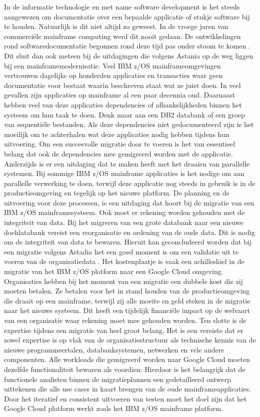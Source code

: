 In de informatie technologie en met name software development is het steeds aangewezen om documentatie over een bepaalde applicatie of stukje software bij te houden. Natuurlijk is dit niet altijd zo geweest. In de vroege jaren van commerciële mainframe computing werd dit nooit gedaan. De ontwikkelingen rond softwaredocumentatie begonnen rond deze tijd pas onder stoom te komen \autocite{Zachry2001}. Dit sluit dan ook meteen  bij de uitdagingen die volgens Astania op de weg liggen bij een mainframemodernisatie. Veel IBM z/OS mainframeomgevingen vertrouwen dagelijks op honderden applicaties en transacties waar geen documentatie voor bestaat waarin beschreven staat wat ze juist doen. In veel gevallen zijn applicaties op mainframe al een paar decennia oud. Daarnaast hebben veel van deze applicaties dependencies of afhankelijkheden binnen het systeem om hun taak te doen. Denk maar aan een DB2 databank of een groep van sequentiële bestanden. Als deze dependencies niet gedocumenteerd zijn is het moeilijk om te achterhalen wat deze applicaties nodig hebben tijdens hun uitvoering. Om een succesvolle migratie door te voeren is het van essentieel belang dat ook de dependencies mee gemigreerd worden met de applicatie. Anderzijds is er een uitdaging dat te maken heeft met het draaien van parallelle systemen. Bij sommige IBM z/OS mainframe applicaties is het nodige om aan parallelle verwerking te doen, terwijl deze applicatie nog steeds in gebruik is in de productieomgeving en tegelijk op het nieuwe platform. De planning en de uitvoering voor deze processen, is een uitdaging dat hoort bij de migratie van een IBM z/OS mainframesysteem. Ook moet er rekening worden gehouden met de integriteit van data. Bij het migreren van een grote databank naar een nieuwe doeldatabank vereist een reorganisatie en ordening van de oude data. Dit is nodig om de integriteit van data te bewaren. Hieruit kan geconcludeerd worden dat bij een migratie volgens Astadia het een goed moment is om een validatie uit te voeren van de organisatiedata \autocite{Astadia2021}. Het kostenplaatje is vaak een achilleshiel in de migratie van het IBM z/OS platform naar een Google Cloud omgeving. Organisaties hebben bij het moment van een migratie een dubbele kost die zij moeten betalen. Ze betalen voor het in stand houden van de productieomgeving die draait op een mainframe, terwijl zij alle moeite en geld steken in de migratie naar het nieuwe systeem. Dit heeft een tijdelijk financiële impact op de welvaart van een organisatie waar rekening moet mee gehouden worden. Ten slotte is de expertise tijdens een migratie van heel groot belang. Het is een vereiste dat er zowel expertise is op vlak van de organisatiestructuur als technische kennis van de nieuwe programmeertalen, databanksystemen, netwerken en vele andere componenten. Alle workloads die gemigreerd worden naar Google Cloud moeten dezelfde functionaliteit bewaren als voordien. Hierdoor is het belangrijk dat de functionele analisten binnen de migratieplannen een gedetailleerd ontwerp uittekenen die alle use cases in kaart brengen van de oude mainframeapplicaties. Door het iteratief en consistent uitvoeren van testen moet het doel zijn dat het Google Cloud platform werkt zoals het IBM z/OS mainframe platform. 

